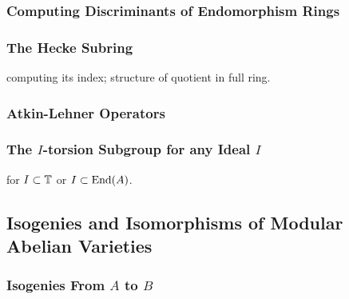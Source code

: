 \documentclass{article}
\begin{document}
\subsubsection{Computing Discriminants of Endomorphism Rings}

\subsubsection{The Hecke Subring}
computing its index; structure of quotient in full ring.


\subsubsection{Atkin-Lehner Operators}

\subsubsection{The $I$-torsion Subgroup for any Ideal $I$}
for $I\subset \mathbb{T}$ or $I\subset\operatorname{End}(A)$.

\subsection{Isogenies and Isomorphisms of Modular Abelian Varieties}

\subsubsection{Isogenies From $A$ to $B$}
\end{document}

